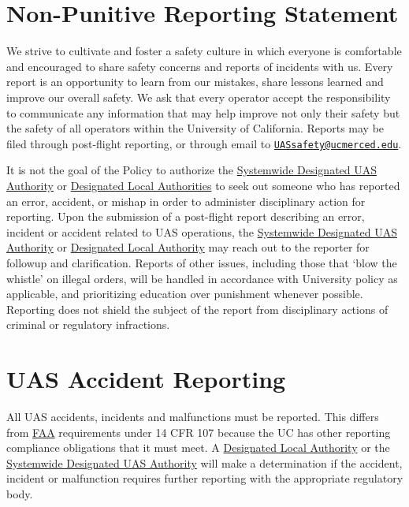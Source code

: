\documentclass[
]{book}
\begin{document}
\hypertarget{ch-nonpunitive}{%
\chapter{Non-Punitive Reporting Statement}\label{ch-nonpunitive}}

We strive to cultivate and foster a safety culture in which everyone is comfortable and encouraged to share safety concerns and reports of incidents with us. Every report is an opportunity to learn from our mistakes, share lessons learned and improve our overall safety. We ask that every operator accept the responsibility to communicate any information that may help improve not only their safety but the safety of all operators within the University of California. Reports may be filed through post-flight reporting, or through email to \href{mailto:UASsafety@ucmerced.edu}{\nolinkurl{UASsafety@ucmerced.edu}}.

It is not the goal of the Policy to authorize the \protect\hyperlink{SDA}{Systemwide Designated UAS Authority} or \protect\hyperlink{DLA}{Designated Local Authorities} to seek out someone who has reported an error, accident, or mishap in order to administer disciplinary action for reporting. Upon the submission of a post-flight report describing an error, incident or accident related to UAS operations, the \protect\hyperlink{SDA}{Systemwide Designated UAS Authority} or \protect\hyperlink{DLA}{Designated Local Authority} may reach out to the reporter for followup and clarification. Reports of other issues, including those that `blow the whistle' on illegal orders, will be handled in accordance with University policy as applicable, and prioritizing education over punishment whenever possible. Reporting does not shield the subject of the report from disciplinary actions of criminal or regulatory infractions.

\hypertarget{ch-accidents}{%
\chapter{UAS Accident Reporting}\label{ch-accidents}}

All UAS accidents, incidents and malfunctions must be reported. This differs from \protect\hyperlink{FAA}{FAA} requirements under 14 CFR 107 because the UC has other reporting compliance obligations that it must meet. A \protect\hyperlink{DLA}{Designated Local Authority} or the \protect\hyperlink{SDA}{Systemwide Designated UAS Authority} will make a determination if the accident, incident or malfunction requires further reporting with the appropriate regulatory body.
\end{document}
